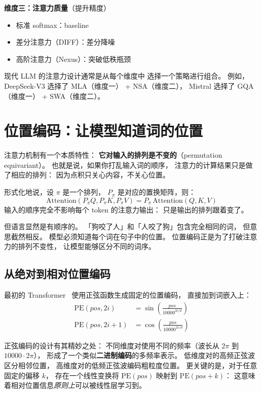 \textbf{维度三：注意力质量}（提升精度）
\begin{itemize}[noitemsep]
  \item 标准 softmax：baseline
  \item 差分注意力（DIFF）：差分降噪
  \item 高阶注意力（Nexus）：突破低秩瓶颈
\end{itemize}

现代 LLM 的注意力设计通常是从每个维度中
选择一个策略进行组合。
例如，DeepSeek-V3 选择了 MLA（维度一） + NSA（维度二），
Mistral 选择了 GQA（维度一） + SWA（维度二）。

\section{位置编码：让模型知道词的位置}
\label{sec:positional-encoding}

注意力机制有一个本质特性：
\textbf{它对输入的排列是不变的}（permutation equivariant）。
也就是说，如果你打乱输入词的顺序，
注意力的计算结果只是做了相应的排列：
因为点积只关心内容，不关心位置。

形式化地说，设 $\pi$ 是一个排列，
$P_\pi$ 是对应的置换矩阵，则：
\[
  \mathrm{Attention}(P_\pi Q, P_\pi K, P_\pi V)
  = P_\pi \, \mathrm{Attention}(Q, K, V)
\]
输入的顺序完全不影响每个 token 的注意力输出：
只是输出的排列跟着变了。

但语言显然是有顺序的。
「狗咬了人」和「人咬了狗」包含完全相同的词，
但意思截然相反。
模型必须知道每个词在句子中的位置。
位置编码正是为了打破注意力的排列不变性，
让模型能够区分不同的词序。

\subsection{从绝对到相对位置编码}

最初的 Transformer~\cite{vaswani2017attention} 使用正弦函数生成固定的位置编码，
直接加到词嵌入上：
\begin{align}
  \mathrm{PE}(pos, 2i) &= \sin\!\left(\frac{pos}{10000^{2i/d}}\right) \\
  \mathrm{PE}(pos, 2i+1) &= \cos\!\left(\frac{pos}{10000^{2i/d}}\right)
\end{align}

正弦编码的设计有其精妙之处：
不同维度对使用不同的频率（波长从 $2\pi$ 到 $10000 \cdot 2\pi$），
形成了一个类似\textbf{二进制编码}的多频率表示。
低维度对的高频正弦波区分相邻位置，
高维度对的低频正弦波编码粗粒度位置。
更关键的是，对于任意固定的偏移 $k$，
存在一个线性变换将 $\mathrm{PE}(pos)$ 映射到 $\mathrm{PE}(pos+k)$：
这意味着相对位置信息\emph{原则上}可以被线性层学习到。

